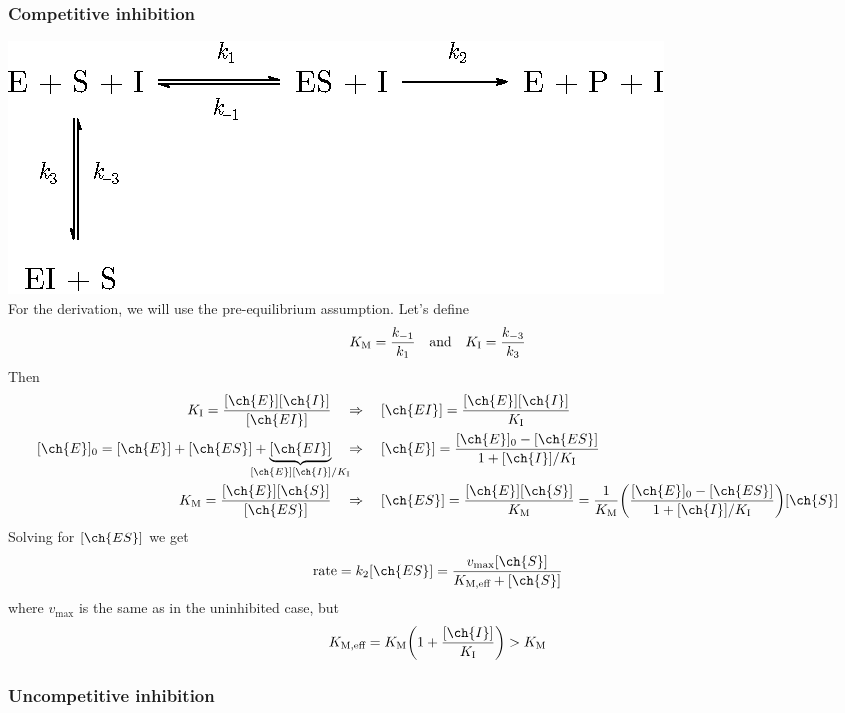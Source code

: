 \documentclass[11pt,a4paper,twoside]{article}
\numberwithin{equation}{section}
\begin{document}
\subsubsection{Competitive inhibition}

\hspace*{2em}\includegraphics{competitive_inhibition.eps}\\

For the derivation, we will use the pre-equilibrium assumption. Let's define
\begin{equation}
    K_{\text{M}} = \frac{k_{-1}}{k_{1}} \qqtext{and} K_{\text{I}} = \frac{k_{-3}}{k_{3}} 
\end{equation}
Then
\begin{align}
    K_{\text{I}} = \frac{[\ch{E}][\ch{I}]}{[\ch{EI}]} \quad & \Rightarrow \quad
    [\ch{EI}] = \frac{[\ch{E}][\ch{I}]}{K_{\text{I}}} \\
    [\ch{E}]_0 =  [\ch{E}] + [\ch{ES}] + \underbrace{[\ch{EI}]}_{\mathclap{[\ch{E}][\ch{I}] / K_{\text{I}}}} \quad & \Rightarrow \quad [\ch{E}] = \frac{[\ch{E}]_0 - [\ch{ES}]}{1 + [\ch{I}] / K_{\text{I}}} \\ 
    K_{\text{M}} = \frac{[\ch{E}][\ch{S}]}{[\ch{ES}]} \quad & \Rightarrow \quad
    [\ch{ES}] = \frac{[\ch{E}][\ch{S}]}{K_{\text{M}}} = \frac{1}{K_{\text{M}}} 
    \qty(\frac{[\ch{E}]_0 - [\ch{ES}]}{1 + [\ch{I}] / K_{\text{I}}}) [\ch{S}]
\end{align}
Solving for $[\ch{ES}]$ we get
\begin{equation}
    \text{rate} = k_2 [\ch{ES}] = \frac{v_{\text{max}} [\ch{S}]}{K_{\text{M,eff}} + [\ch{S}]} 
\end{equation}
where $v_{\text{max}}$ is the same as in the uninhibited case, but
\begin{equation}
    K_{\text{M,eff}} = K_{\text{M}} \qty(1 + \frac{[\ch{I}]}{K_{\text{I}}}) > K_{\text{M}}
\end{equation}

\subsubsection{Uncompetitive inhibition}
\end{document}
